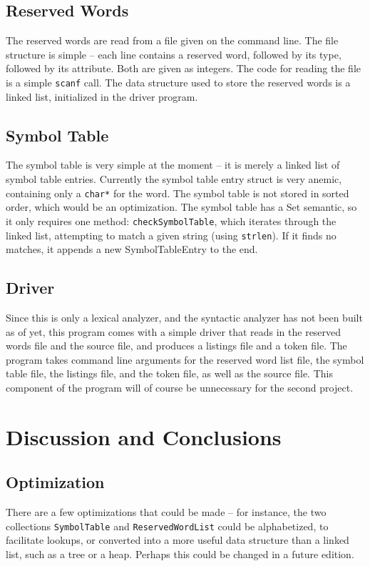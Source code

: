 \documentclass[titlepage]{article}
\begin{document}
		\subsection{Reserved Words}
			The reserved words are read from a file given on the command line. The file structure is simple -- each line contains a reserved word, followed by its type, followed by its attribute. Both are given as integers. The code for reading the file is a simple \texttt{scanf} call. The data structure used to store the reserved words is a linked list, initialized in the driver program.
		\subsection{Symbol Table}
			The symbol table is very simple at the moment -- it is merely a linked list of symbol table entries. Currently the symbol table entry struct is very anemic, containing only a \texttt{char*} for the word. The symbol table is not stored in sorted order, which would be an optimization. The symbol table has a Set semantic, so it only requires one method: \texttt{checkSymbolTable}, which iterates through the linked list, attempting to match a given string (using \texttt{strlen}). If it finds no matches, it appends a new SymbolTableEntry to the end.
		\subsection{Driver}
			Since this is only a lexical analyzer, and the syntactic analyzer has not been built as of yet, this program comes with a simple driver that reads in the reserved words file and the source file, and produces a listings file and a token file. The program takes command line arguments for the reserved word list file, the symbol table file, the listings file, and the token file, as well as the source file. This component of the program will of course be unnecessary for the second project.
	\section{Discussion and Conclusions}
		\subsection{Optimization}
			There are a few optimizations that could be made -- for instance, the two collections \texttt{SymbolTable} and \texttt{ReservedWordList} could be alphabetized, to facilitate lookups, or converted into a more useful data structure than a linked list, such as a tree or a heap. Perhaps this could be changed in a future edition.
\end{document}
